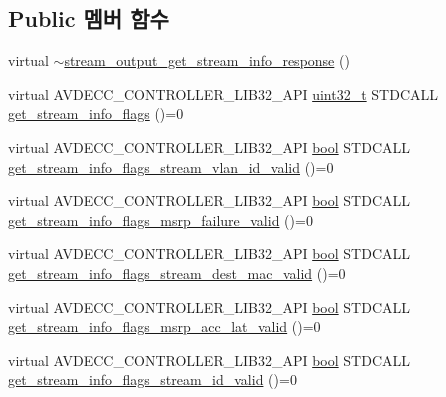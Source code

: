 \subsection*{Public 멤버 함수}
\begin{DoxyCompactItemize}
\item 
virtual \hyperlink{classavdecc__lib_1_1stream__output__get__stream__info__response_aeb4f0de01f08772b51396048f5ca6937}{$\sim$stream\+\_\+output\+\_\+get\+\_\+stream\+\_\+info\+\_\+response} ()
\item 
virtual A\+V\+D\+E\+C\+C\+\_\+\+C\+O\+N\+T\+R\+O\+L\+L\+E\+R\+\_\+\+L\+I\+B32\+\_\+\+A\+PI \hyperlink{parse_8c_a6eb1e68cc391dd753bc8ce896dbb8315}{uint32\+\_\+t} S\+T\+D\+C\+A\+LL \hyperlink{classavdecc__lib_1_1stream__output__get__stream__info__response_a24ae25b3a229f07ea76104024141ca84}{get\+\_\+stream\+\_\+info\+\_\+flags} ()=0
\item 
virtual A\+V\+D\+E\+C\+C\+\_\+\+C\+O\+N\+T\+R\+O\+L\+L\+E\+R\+\_\+\+L\+I\+B32\+\_\+\+A\+PI \hyperlink{avb__gptp_8h_af6a258d8f3ee5206d682d799316314b1}{bool} S\+T\+D\+C\+A\+LL \hyperlink{classavdecc__lib_1_1stream__output__get__stream__info__response_a3a361aef8a701f2684127d56b81c730a}{get\+\_\+stream\+\_\+info\+\_\+flags\+\_\+stream\+\_\+vlan\+\_\+id\+\_\+valid} ()=0
\item 
virtual A\+V\+D\+E\+C\+C\+\_\+\+C\+O\+N\+T\+R\+O\+L\+L\+E\+R\+\_\+\+L\+I\+B32\+\_\+\+A\+PI \hyperlink{avb__gptp_8h_af6a258d8f3ee5206d682d799316314b1}{bool} S\+T\+D\+C\+A\+LL \hyperlink{classavdecc__lib_1_1stream__output__get__stream__info__response_a66f8db5ffff809dc5ae3b96c8d43eaf5}{get\+\_\+stream\+\_\+info\+\_\+flags\+\_\+msrp\+\_\+failure\+\_\+valid} ()=0
\item 
virtual A\+V\+D\+E\+C\+C\+\_\+\+C\+O\+N\+T\+R\+O\+L\+L\+E\+R\+\_\+\+L\+I\+B32\+\_\+\+A\+PI \hyperlink{avb__gptp_8h_af6a258d8f3ee5206d682d799316314b1}{bool} S\+T\+D\+C\+A\+LL \hyperlink{classavdecc__lib_1_1stream__output__get__stream__info__response_a1089d406a845dc42da30dbb1cd627f09}{get\+\_\+stream\+\_\+info\+\_\+flags\+\_\+stream\+\_\+dest\+\_\+mac\+\_\+valid} ()=0
\item 
virtual A\+V\+D\+E\+C\+C\+\_\+\+C\+O\+N\+T\+R\+O\+L\+L\+E\+R\+\_\+\+L\+I\+B32\+\_\+\+A\+PI \hyperlink{avb__gptp_8h_af6a258d8f3ee5206d682d799316314b1}{bool} S\+T\+D\+C\+A\+LL \hyperlink{classavdecc__lib_1_1stream__output__get__stream__info__response_a54f69ff970809ded4916bb29b7945c14}{get\+\_\+stream\+\_\+info\+\_\+flags\+\_\+msrp\+\_\+acc\+\_\+lat\+\_\+valid} ()=0
\item 
virtual A\+V\+D\+E\+C\+C\+\_\+\+C\+O\+N\+T\+R\+O\+L\+L\+E\+R\+\_\+\+L\+I\+B32\+\_\+\+A\+PI \hyperlink{avb__gptp_8h_af6a258d8f3ee5206d682d799316314b1}{bool} S\+T\+D\+C\+A\+LL \hyperlink{classavdecc__lib_1_1stream__output__get__stream__info__response_aac97139921d5f55f8f166b8f013766a1}{get\+\_\+stream\+\_\+info\+\_\+flags\+\_\+stream\+\_\+id\+\_\+valid} ()=0

\end{DoxyCompactItemize}
